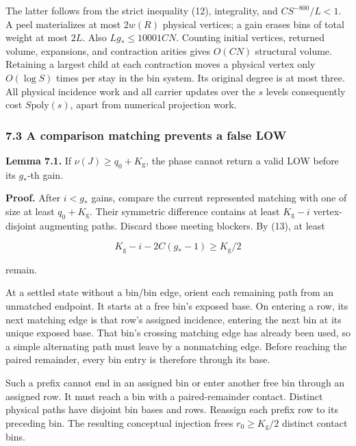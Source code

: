 The latter follows from the strict inequality (12), integrality, and \(CS^{-800}/L<1\). A peel materializes at most \(2w(R)\) physical vertices; a gain erases bins of total weight at most \(2L\). Also \(Lg_*\leq10001CN\). Counting initial vertices, returned volume, expansions, and contraction arities gives \(O(CN)\) structural volume. Retaining a largest child at each contraction moves a physical vertex only \(O(\log S)\) times per stay in the bin system. Its original degree is at most three. All physical incidence work and all carrier updates over the \(s\) levels consequently cost \(S\mathrm{poly}(s)\), apart from numerical projection work.

\hypertarget{af-46593eb93e-a-comparison-matching-prevents-a-false-low}{%
\subsubsection{7.3 A comparison matching prevents a false LOW}\label{af-46593eb93e-a-comparison-matching-prevents-a-false-low}}

\textbf{Lemma 7.1.} If \(\nu(J)\geq q_0+K_{\mathrm g}\), the phase cannot return a valid LOW before its \(g_*\)-th gain.

\textbf{Proof.} After \(i<g_*\) gains, compare the current represented matching with one of size at least \(q_0+K_{\mathrm g}\). Their symmetric difference contains at least \(K_{\mathrm g}-i\) vertex-disjoint augmenting paths. Discard those meeting blockers. By (13), at least

\[
K_{\mathrm g}-i-2C(g_*-1)\geq K_{\mathrm g}/2
 \tag{14}
\]

remain.

At a settled state without a bin/bin edge, orient each remaining path from an unmatched endpoint. It starts at a free bin's exposed base. On entering a row, its next matching edge is that row's assigned incidence, entering the next bin at its unique exposed base. That bin's crossing matching edge has already been used, so a simple alternating path must leave by a nonmatching edge. Before reaching the paired remainder, every bin entry is therefore through its base.

Such a prefix cannot end in an assigned bin or enter another free bin through an assigned row. It must reach a bin with a paired-remainder contact. Distinct physical paths have disjoint bin bases and rows. Reassign each prefix row to its preceding bin. The resulting conceptual injection frees \(r_0\geq K_{\mathrm g}/2\) distinct contact bins.

